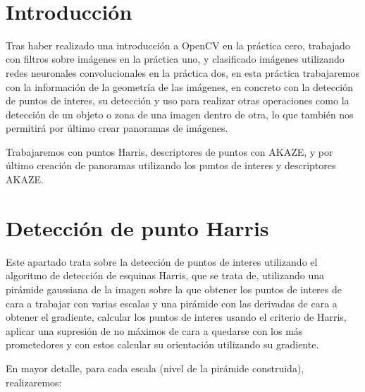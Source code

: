 \documentclass[12pt, spanish]{article}
\makeatletter
\let\thedate\@date
\makeatother
\begin{document}
\begin{titlepage}
    {\large \thedate}\\[0.5cm]
    {\doclicenseThis}

    \vfill

\end{titlepage}


\tableofcontents
\pagebreak



\section*{Introducción}

Tras haber realizado una introducción a OpenCV en la práctica cero, trabajado con filtros sobre imágenes en la práctica uno, y clasificado imágenes utilizando redes neuronales convolucionales en la práctica dos, en esta práctica trabajaremos con la información de la geometría de las imágenes, en concreto con la detección de puntos de interes, su detección y uso para realizar otras operaciones como la detección de un objeto o zona de una imagen dentro de otra, lo que también nos permitirá por último crear panoramas de imágenes.

Trabajaremos con puntos Harris, descriptores de puntos con AKAZE, y por último creación de panoramas utilizando los puntos de interes y descriptores AKAZE.

\section{Detección de punto Harris}

Este apartado trata sobre la detección de puntos de interes utilizando el algoritmo de detección de esquinas Harris, que se trata de, utilizando una pirámide gaussiana de la imagen sobre la que obtener los puntos de interes de cara a trabajar con varias escalas y una pirámide con las derivadas de cara a obtener el gradiente, calcular los puntos de interes usando el criterio de Harris, aplicar una supresión de no máximos de cara a quedarse con los más prometedores y con estos calcular su orientación utilizando su gradiente\cite{harris}.

En mayor detalle, para cada escala (nivel de la pirámide construida), realizaremos:
\end{document}
